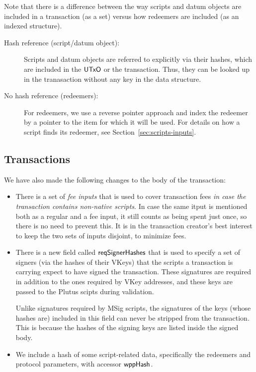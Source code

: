Note that there is a difference between the way scripts and datum objects are included in
a transaction (as a set) versus how redeemers are included
(as an indexed structure).

\begin{description}
\item
  [Hash reference (script/datum object):]
  Scripts and datum objects are referred to explicitly via their hashes,
  which are included in the $\mathsf{UTxO}$ or the transaction. Thus, they can be
  looked up in the tranasaction without any key in the data structure.

  \item[No hash reference (redeemers):] For redeemers,
  we use a reverse pointer approach and
  index the redeemer by a pointer to the item for which it will be used.
  For details on how a script finds its redeemer, see Section~\ref{sec:scripts-inputs}.
\end{description}

\subsection{Transactions}
We have also made the following changes to
the body of the transaction:

\begin{itemize}
  \item There is a set of \emph{fee inputs} that is used to cover transaction fees
    \emph{in case the transaction contains non-native scripts}. In case the same itput is mentioned both as
    a regular and a fee input, it still counts as being spent just once, so there is no need to prevent this.
    It is in the transaction creator's best interest to keep the two sets of inputs disjoint, to minimize fees.
  \item There is a new field called $\mathsf{reqSignerHashes}$ that is used to specify a set of signers (via the
    hashes of their VKeys) that the scripts a transaction is carrying expect to have signed the transaction.
    These signatures are required in addition to the ones required by VKey addresses, and
    these keys are passed to the Plutus scipts during validation.

    Unlike signatures required by MSig scripts, the signatures of the keys
    (whose hashes are) included
    in this field can never be stripped from the transaction. This is because
    the hashes of the signing keys are listed inside the signed body.
  \item We include a hash of some script-related data, specifically the redeemers and protocol parameters,
    with accessor $\mathsf{wppHash}$.
\end{itemize}

